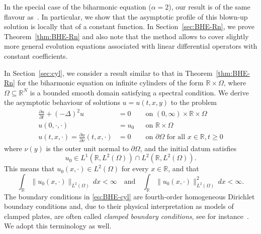 \documentclass[a4paper, reqno,titlepage]{amsart}
\numberwithin{equation}{section}
\theoremstyle{plain}
\theoremstyle{definition}
\theoremstyle{remark}
\newcommand{\RR}{\mathbb{R}}
\begin{document}
In the special case of the biharmonic equation ($\alpha=2$), our result is of the same flavour as~\cite[Theorem 1.1]{FGG}. In particular, we show that the asymptotic profile of this blown-up solution is locally that of a constant function. In Section~\ref{sec:BHE-Rn}, we prove Theorem~\ref{thm:BHE-Rn} and also note that the method allows to cover slightly more general evolution equations associated with linear differential operators with constant coefficients.

In Section~\ref{sec:cyl}, we consider a result similar to that in Theorem~\ref{thm:BHE-Rn} for the biharmonic equation on infinite cylinders of the form $\RR \times \Omega$, where $\Omega \subseteq \RR^N$ is a bounded smooth domain satisfying a spectral condition. We derive the asymptotic behaviour of solutions $u = u(t,x,y)$ to the problem
\begin{equation}
  \label{eq:BHE-cyl}
  \begin{aligned}
    \frac{\partial u}{\partial t} + (-\Delta)^2 u            & = 0   &  & \text{on } (0, \infty) \times \RR \times \Omega                \\
    u(0, \cdot, \cdot)                                       & = u_0 &  & \text{on } \RR \times \Omega                                   \\
    u(t,x,\cdot) =\frac{\partial u}{\partial \nu}(t,x,\cdot) & = 0   &  & \text{on } \partial\Omega \text{ for all } x \in \RR, t \geq 0
  \end{aligned}
\end{equation}
where $\nu(y)$ is the outer unit normal to $\partial\Omega$, and the initial datum satisfies
\begin{equation}
  \label{eq:BHE-cyl-u0}
  u_0 \in L^1(\RR, L^2(\Omega)) \cap L^2 (\RR, L^2(\Omega)).
\end{equation}
This means that $u_0(x, \cdot) \in L^2(\Omega)$ for every $x \in \RR$, and that
\begin{equation*}
  \int_\RR \| u_0(x,\cdot) \|_{L^2(\Omega)} \,dx < \infty \quad \text{and} \quad \int_\RR \| u_0(x,\cdot) \|^2_{L^2(\Omega)} \,dx < \infty.
\end{equation*}
The boundary conditions in \eqref{eq:BHE-cyl} are fourth-order homogeneous Dirichlet boundary conditions and, due to their physical interpretation as models of clamped plates, are often called \emph{clamped boundary conditions}, see for instance~\cite[Section 1.1.2]{GGS}. We adopt this terminology as well.
\end{document}
